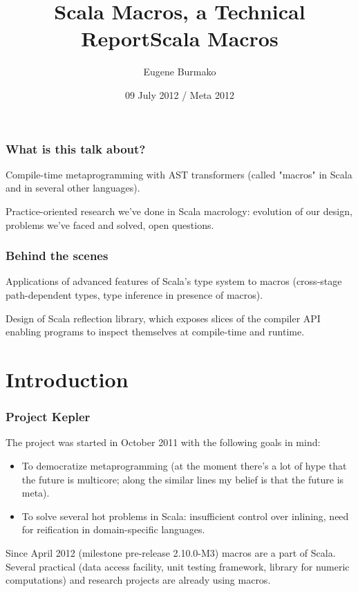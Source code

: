 \documentclass[hyperref={bookmarks=false}]{beamer}
\title{Scala Macros, a Technical Report}
\begin{document}
\title{Scala Macros}
\author{Eugene Burmako}
\date{09 July 2012 / Meta 2012}
\maketitle

\begin{frame}[fragile]
\frametitle{What is this talk about?}
Compile-time metaprogramming with AST transformers (called "macros" in Scala and in several other languages).

Practice-oriented research we've done in Scala macrology: evolution of our design, problems we've faced and solved,
open questions.
\end{frame}

\begin{frame}[fragile]
\frametitle{Behind the scenes}
Applications of advanced features of Scala's type system to macros (cross-stage path-dependent types, type inference in presence of macros).

Design of Scala reflection library, which exposes slices of the compiler API enabling programs to inspect themselves at compile-time and runtime.
\end{frame}

\section{Introduction}

\begin{frame}[fragile]
\frametitle{Project Kepler}

The project was started in October 2011 with the following goals in mind:
\begin{itemize}
\item To democratize metaprogramming (at the moment there's a lot of hype that the future is multicore; along the similar lines my belief is that the future is meta).
\item To solve several hot problems in Scala: insufficient control over inlining, need for reification in domain-specific languages.
\end{itemize}

Since April 2012 (milestone pre-release 2.10.0-M3) macros are a part of Scala. Several practical (data access facility, unit testing framework, library for numeric computations) and research projects are already using macros.
\end{frame}
\end{document}
